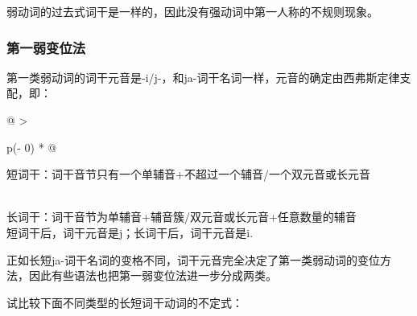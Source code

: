 弱动词的过去式词干是一样的，因此没有强动词中第一人称的不规则现象。

\subsubsection{第一弱变位法}\label{第一弱变位法}

第一类弱动词的词干元音是-i/j-，和ja-词干名词一样，元音的确定由西弗斯定律支配，即：

\begin{longtable}[]{@{}
  >{\raggedright\arraybackslash}p{(\columnwidth - 0\tabcolsep) * }@{}}
  \toprule\noalign{}
  \begin{minipage}[b]{\linewidth}\raggedright
    短词干：词干音节只有一个单辅音+不超过一个辅音/一个双元音或长元音
  \end{minipage} \\
  \midrule\noalign{}
  \endhead
  \bottomrule\noalign{}
  \endlastfoot
  长词干：词干音节为单辅音+辅音簇/双元音或长元音+任意数量的辅音   \\
  短词干后，词干元音是j；长词干后，词干元音是i.                   \\
\end{longtable}

正如长短ja-词干名词的变格不同，词干元音完全决定了第一类弱动词的变位方法，因此有些语法也把第一弱变位法进一步分成两类。

试比较下面不同类型的长短词干动词的不定式：

